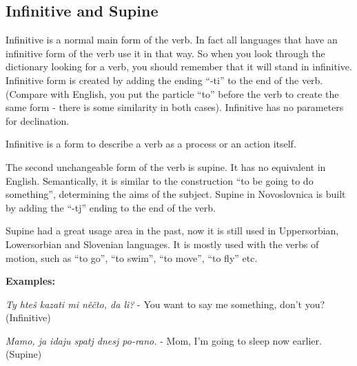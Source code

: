 \subsection{Infinitive and Supine}

Infinitive is a normal main form of the verb. In fact all languages that have an infinitive form of the verb use it in that way. So when you look through the dictionary looking for a verb, you should remember that it will stand in infinitive. Infinitive form is created by adding the ending “-ti” to the end of the verb. (Compare with English, you put the particle “to” before the verb to create the same form - there is some similarity in both cases). Infinitive has no parameters for declination.

Infinitive is a form to describe a verb as a process or an action itself.

The second unchangeable form of the verb is supine. It has no equivalent in English. Semantically, it is similar to the construction “to be going to do something”, determining the aims of the subject. Supine in Novoslovnica is built by adding the “-tj” ending to the end of the verb.

Supine had a great usage area in the past, now it is still used in Uppersorbian, Lowersorbian and Slovenian languages. It is mostly used with the verbs of motion, such as “to go”, “to swim”, “to move”, “to fly” etc.

\textbf{Examples:}

\textit{Ty hteš kazati mi něčto, da li?} - You want to say me something, don’t you? (Infinitive)

\textit{Mamo, ja idaju spatj dnesj po-rano.} - Mom, I’m going to sleep now earlier. (Supine)
